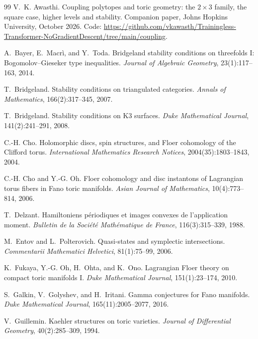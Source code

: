 \documentclass[11pt]{article}
\theoremstyle{definition}
\theoremstyle{remark}
\begin{document}
\begin{thebibliography}{99}
V.~K. Awasthi.
\newblock Coupling polytopes and toric geometry: the $2\times3$ family, the square case, higher levels and stability.
\newblock Companion paper, Johns Hopkins University, October 2026. Code: \url{https://github.com/vkawasth/Trainingless-Transformer-NoGradientDescent/tree/main/coupling}.

A.~Bayer, E.~Macr\`i, and Y.~Toda.
\newblock Bridgeland stability conditions on threefolds {I}: {B}ogomolov--{G}ieseker type inequalities.
\newblock \emph{Journal of Algebraic Geometry}, 23(1):117--163, 2014.

T.~Bridgeland.
\newblock Stability conditions on triangulated categories.
\newblock \emph{Annals of Mathematics}, 166(2):317--345, 2007.

T.~Bridgeland.
\newblock Stability conditions on {K}3 surfaces.
\newblock \emph{Duke Mathematical Journal}, 141(2):241--291, 2008.

C.-H. Cho.
\newblock Holomorphic discs, spin structures, and {F}loer cohomology of the {C}lifford torus.
\newblock \emph{International Mathematics Research Notices}, 2004(35):1803--1843, 2004.

C.-H. Cho and Y.-G. Oh.
\newblock Floer cohomology and disc instantons of {L}agrangian torus fibers in {F}ano toric manifolds.
\newblock \emph{Asian Journal of Mathematics}, 10(4):773--814, 2006.

T.~Delzant.
\newblock Hamiltoniens p\'eriodiques et images convexes de l'application moment.
\newblock \emph{Bulletin de la Soci\'et\'e Math\'ematique de France}, 116(3):315--339, 1988.

M.~Entov and L.~Polterovich.
\newblock Quasi-states and symplectic intersections.
\newblock \emph{Commentarii Mathematici Helvetici}, 81(1):75--99, 2006.

K.~Fukaya, Y.-G. Oh, H.~Ohta, and K.~Ono.
\newblock Lagrangian {F}loer theory on compact toric manifolds {I}.
\newblock \emph{Duke Mathematical Journal}, 151(1):23--174, 2010.

S.~Galkin, V.~Golyshev, and H.~Iritani.
\newblock Gamma conjectures for {F}ano manifolds.
\newblock \emph{Duke Mathematical Journal}, 165(11):2005--2077, 2016.

V.~Guillemin.
\newblock Kaehler structures on toric varieties.
\newblock \emph{Journal of Differential Geometry}, 40(2):285--309, 1994.


\end{thebibliography}
\end{document}
